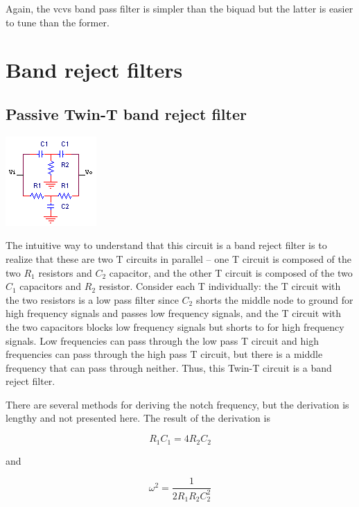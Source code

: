 Again, the \ac{vcvs} band pass filter is simpler than the biquad but the latter is easier to tune than the former. \autocite[140]{op-amp-circuits-johnson}

\section{Band reject filters}

\subsection{Passive Twin-T band reject filter}
\begin{center}
	\includegraphics{schematics/passiveTwinTbandrejectfilter.PNG}
\end{center}
The intuitive way to understand that this circuit is a band reject filter is to realize that these are two T circuits in parallel -- one T circuit is composed of the two $R_1$ resistors and $C_2$ capacitor, and the other T circuit is composed of the two $C_1$ capacitors and $R_2$ resistor.
Consider each T individually:
the T circuit with the two resistors is a low pass filter since $C_2$ shorts the middle node to ground for high frequency signals and passes low frequency signals, and the T circuit with the two capacitors blocks low frequency signals but shorts \vin to \vout for high frequency signals.
Low frequencies can pass through the low pass T circuit and high frequencies can pass through the high pass T circuit, but there is a middle frequency that can pass through neither.
Thus, this Twin-T circuit is a band reject filter.

There are several methods for deriving the notch frequency, but the derivation is lengthy and not presented here.
The result of the derivation \autocite[see][]{cr-bond-twin-t-notch} is

\begin{equation}
	R_1 C_1 = 4R_2C_2
\end{equation}

and

\begin{equation}
\omega^{2} = \frac{1}{2 R_1 R_2 C_2^2}
\end{equation}

